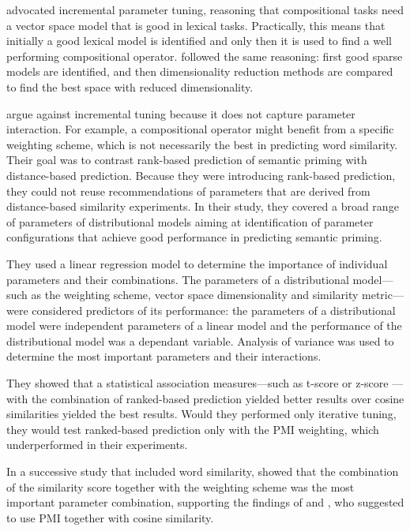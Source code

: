 \citet{kiela-clark:2014:CVSC} advocated incremental parameter tuning, reasoning that compositional tasks need a vector space model that is good in lexical tasks. Practically, this means that initially a good lexical model is identified and only then it is used to find a well performing compositional operator. \citet{BullinariaLevy2012} followed the same reasoning: first good sparse models are identified, and then dimensionality reduction methods are compared to find the best space with reduced dimensionality.

\citet{lapesa-evert:2013:CMCL} argue against incremental tuning because it does not capture parameter interaction. For example, a compositional operator might benefit from a specific weighting scheme, which is not necessarily the best in predicting word similarity. Their goal was to contrast rank-based prediction of semantic priming with distance-based prediction. Because they were introducing rank-based prediction, they could not reuse recommendations of parameters that are derived from distance-based similarity experiments. In their study, they covered a broad range of parameters of distributional models aiming at identification of parameter configurations that achieve good performance in predicting semantic priming.

They used a linear regression model to determine the importance of individual parameters and their combinations. The parameters of a distributional model---such as the weighting scheme, vector space dimensionality and similarity metric---were considered predictors of its performance: the parameters of a distributional model were independent parameters of a linear model and the performance of the distributional model was a dependant variable. Analysis of variance was used to determine the most important parameters and their interactions.

They showed that a statistical association measures---such as t-score or z-score \cite{Evert05}---with the combination of ranked-based prediction yielded better results over cosine similarities yielded the best results. Would they performed only iterative tuning, they would test ranked-based prediction only with the PMI weighting, which underperformed in their experiments.

In a successive study that included word similarity, \citet{lapesa2014large} showed that the combination of the similarity score together with the weighting scheme was the most important parameter combination, supporting the findings of  and , who suggested to use PMI together with cosine similarity.

